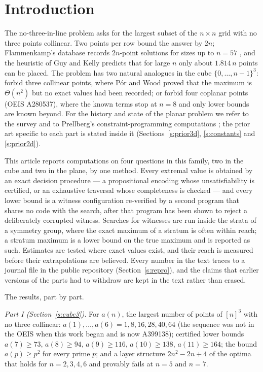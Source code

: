 \documentclass[11pt,a4paper]{article}
\begin{document}
\section{Introduction}\label{s:intro}
The no-three-in-line problem asks for the largest subset of the $n\times n$ grid with no three points collinear.  Two points per
row bound the answer by $2n$; Flammenkamp's database records $2n$-point solutions for sizes up to $n=57$ \cite{Flammenkamp}, and
the heuristic of Guy and Kelly \cite{GuyKelly} predicts that for large $n$ only about $1.814\,n$ points can be placed.  The problem
has two natural analogues in the cube $\{0,\dots,n-1\}^3$: forbid three collinear points, where P\'or and Wood \cite{PorWood}
proved that the maximum is $\Theta(n^2)$ but no exact values had been recorded; or forbid four coplanar points (OEIS A280537),
where the known terms stop at $n=8$ and only lower bounds are known beyond.  For the history and state of the planar problem we
refer to the survey \cite{Survey} and to Prellberg's constraint-programming computations \cite{Prellberg}; the prior art specific
to each part is stated inside it (Sections~\ref{s:prior3d}, \ref{s:constants} and \ref{s:prior2d}).

This article reports computations on four questions in this family, two in the cube and two in the plane, by one method.  Every
extremal value is obtained by an exact decision procedure --- a propositional encoding whose unsatisfiability is certified, or an
exhaustive traversal whose completeness is checked --- and every lower bound is a witness configuration re-verified by a second
program that shares no code with the search, after that program has been shown to reject a deliberately corrupted witness.
Searches for witnesses are run inside the strata of a symmetry group, where the exact maximum of a stratum is often within reach; a
stratum maximum is a lower bound on the true maximum and is reported as such.  Estimates are tested where exact values exist, and
their reach is measured before their extrapolations are believed.  Every number in the text traces to a journal file in the public
repository (Section~\ref{s:repro}), and the claims that earlier versions of the parts had to withdraw are kept in the text rather
than erased.

The results, part by part.

\emph{Part I (Section~\ref{s:cube3}).}  For $a(n)$, the largest number of points of $[n]^3$ with no three collinear:
$a(1),\dots,a(6)=1,8,16,28,40,64$ (the sequence was not in the OEIS when this work began and is now A399138); certified lower
bounds $a(7)\ge73$, $a(8)\ge94$, $a(9)\ge116$, $a(10)\ge138$, $a(11)\ge164$; the bound $a(p)\ge p^2$ for every prime $p$; and a
layer structure $2n^2-2n+4$ of the optima that holds for $n=2,3,4,6$ and provably fails at $n=5$ and $n=7$.
\end{document}
